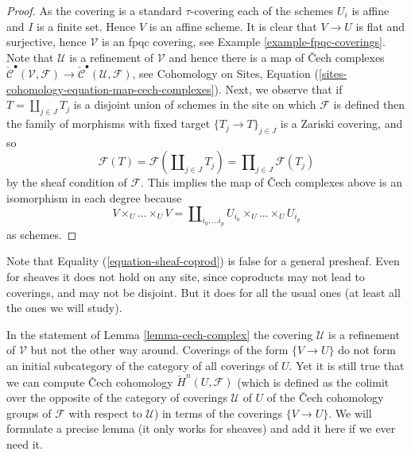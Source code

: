\begin{proof}
As the covering is a standard $\tau$-covering each of the schemes
$U_i$ is affine and $I$ is a finite set. Hence $V$ is an affine scheme.
It is clear that $V \to U$ is flat and surjective, hence
$\mathcal{V}$ is an fpqc covering, see
Example \ref{example-fpqc-coverings}.
Note that $\mathcal{U}$ is a refinement of $\mathcal{V}$
and hence there is a map of {\v C}ech complexes
$\check{\mathcal{C}}^\bullet (\mathcal{V}, \mathcal{F}) \to
\check{\mathcal{C}}^\bullet (\mathcal{U}, \mathcal{F})$, see
Cohomology on Sites,
Equation (\ref{sites-cohomology-equation-map-cech-complexes}).
Next, we observe that if $T = \coprod_{j \in J} T_j$ is a
disjoint union of schemes in the site on which $\mathcal{F}$ is defined
then the family of morphisms with fixed target
$\{T_j \to T\}_{j \in J}$ is a Zariski covering, and so
\begin{equation}
\label{equation-sheaf-coprod}
\mathcal{F}(T) =
\mathcal{F}(\coprod\nolimits_{j \in J} T_j) =
\prod\nolimits_{j \in J} \mathcal{F}(T_j)
\end{equation}
by the sheaf condition of $\mathcal{F}$.
This implies the map of {\v C}ech complexes above is an isomorphism
in each degree because
$$
V \times_U \ldots \times_U V
=
\coprod\nolimits_{i_0, \ldots i_p} U_{i_0} \times_U \ldots \times_U U_{i_p}
$$
as schemes.
\end{proof}

\noindent
Note that Equality (\ref{equation-sheaf-coprod})
is false for a general presheaf. Even for sheaves it does not hold on any
site, since coproducts may not lead to coverings, and may not be disjoint.
But it does for all the usual ones (at least all the ones we will study).

\begin{remark}
\label{remark-refinement}
In the statement of Lemma \ref{lemma-cech-complex} the covering $\mathcal{U}$
is a refinement of $\mathcal{V}$ but not the other way around. Coverings
of the form $\{V \to U\}$ do not form an initial subcategory of the
category of all coverings of $U$. Yet it is still true that
we can compute {\v C}ech cohomology $\check H^n(U, \mathcal{F})$ (which
is defined as the colimit over the opposite of the category of
coverings $\mathcal{U}$ of $U$ of the {\v C}ech cohomology groups of
$\mathcal{F}$ with respect to $\mathcal{U}$) in terms of the coverings
$\{V \to U\}$. We will formulate a precise lemma (it only works for sheaves)
and add it here if we ever need it.
\end{remark}

